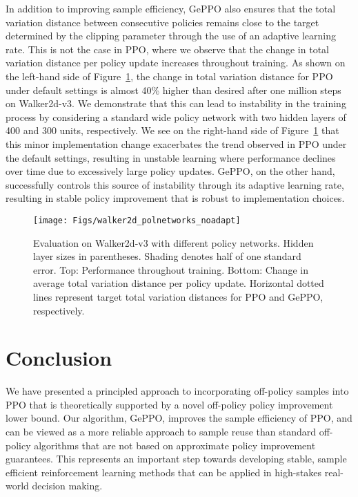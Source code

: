 \documentclass{article}
\begin{document}
In addition to improving sample efficiency, GePPO also ensures that the total variation distance between consecutive policies remains close to the target determined by the clipping parameter through the use of an adaptive learning rate. This is not the case in PPO, where we observe that the change in total variation distance per policy update increases throughout training. As shown on the left-hand side of Figure~\ref{fig:wide}, the change in total variation distance for PPO under default settings is almost 40\% higher than desired after one million steps on Walker2d-v3. We demonstrate that this can lead to instability in the training process by considering a standard wide policy network with two hidden layers of 400 and 300 units, respectively. We see on the right-hand side of Figure~\ref{fig:wide} that this minor implementation change exacerbates the trend observed in PPO under the default settings, resulting in unstable learning where performance declines over time due to excessively large policy updates. GePPO, on the other hand, successfully controls this source of instability through its adaptive learning rate, resulting in stable policy improvement that is robust to implementation choices. 

\begin{figure}
\centering
\texttt{[image: Figs/walker2d\_polnetworks\_noadapt]}
\caption{Evaluation on Walker2d-v3 with different policy networks. Hidden layer sizes in parentheses. Shading denotes half of one standard error. Top: Performance throughout training. Bottom: Change in average total variation distance per policy update. Horizontal dotted lines represent target total variation distances for PPO and GePPO, respectively.}\label{fig:wide}
\end{figure}


\section{Conclusion}\label{sec:conclusion}

We have presented a principled approach to incorporating off-policy samples into PPO that is theoretically supported by a novel off-policy policy improvement lower bound. Our algorithm, GePPO, improves the sample efficiency of PPO, and can be viewed as a more reliable approach to sample reuse than standard off-policy algorithms that are not based on approximate policy improvement guarantees. This represents an important step towards developing stable, sample efficient reinforcement learning methods that can be applied in high-stakes real-world decision making.
\end{document}
